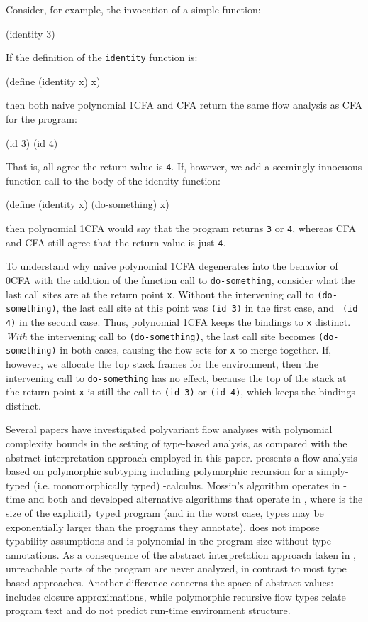 Consider, for example, the invocation of a simple 
function:
\begin{code}
(identity 3)\end{code}
If the definition of the {\tt identity} function is:
\begin{code}
(define (identity x) x)\end{code}
then both naive polynomial 1CFA and CFA return the same flow analysis
as CFA for the program:
\begin{code}
(id 3)
(id 4)\end{code}
That is, all agree the return value is {\tt 4}.
If, however, we add a seemingly innocuous function call to the body of the identity function:
\begin{code}
(define (identity x)
        (do-something)
        x)\end{code} 
then polynomial 1CFA would say that the program returns {\tt 3} or {\tt 4}, 
whereas CFA and CFA still agree that the return value is just {\tt 4}.

To understand why naive polynomial 1CFA degenerates into the behavior of 0CFA with
the addition of the function call to {\tt do-something}, consider
what the last  call sites are at the return point {\tt x}.
Without the intervening call to {\tt (do-something)}, the last call
site at this point was {\tt (id 3)} in the first case, and {\tt
  (id 4)} in the second case.
Thus, polynomial 1CFA keeps the bindings to {\tt x} distinct.
\emph{With} the intervening call to {\tt (do-something)}, the last 
call site becomes {\tt (do-something)} in both cases, causing
the flow sets for {\tt x} to merge together.
If, however, we allocate the top  stack frames for the
environment, then the intervening call to {\tt do-something} has no
effect, because the top of the stack at the return point {\tt x} is
still the call to {\tt (id 3)} or {\tt (id 4)}, which keeps the
bindings distinct.





Several papers have investigated polyvariant flow analyses with
polynomial complexity bounds in the setting of type-based analysis, as
compared with the abstract interpretation approach employed in this
paper.
\citet{dvanhorn:Mossin:97:FlowAnalysis} presents a flow analysis based
on polymorphic subtyping including polymorphic recursion for a
simply-typed (i.e. monomorphically typed) -calculus.
Mossin's algorithm operates in -time and both
\citet{dvanhorn:Rehof:POPL01} and \citet{dvanhorn:Gustavsson:PADO01}
developed alternative algorithms that operate in , where 
is the size of the explicitly typed program (and in the worst case,
types may be exponentially larger than the programs they annotate).
\nCFA{} does not impose typability assumptions and is polynomial in
the program size without type annotations.
As a consequence of the abstract interpretation approach taken in
\nCFA{}, unreachable parts of the program are never analyzed,
in contrast to most type based approaches.
Another difference concerns the space of abstract values: \nCFA{}
includes closure approximations, while polymorphic recursive flow
types relate program text and do not predict run-time environment
structure.

